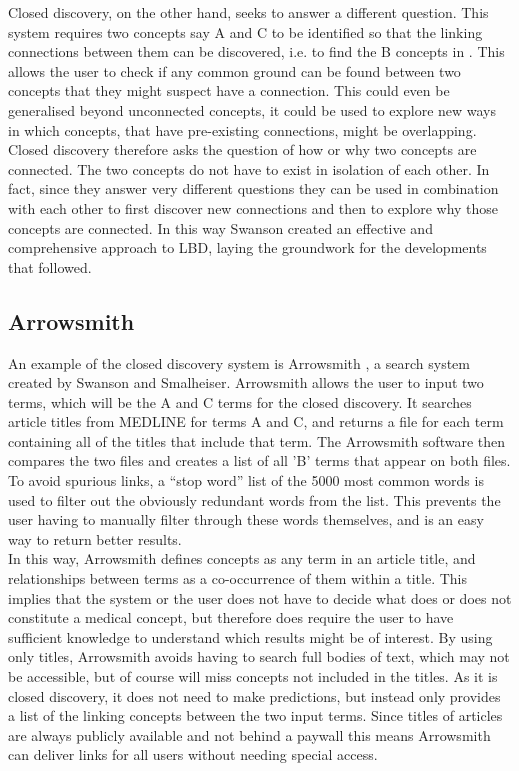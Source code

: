 \documentclass{l4proj}
\begin{document}
Closed discovery, on the other hand, seeks to answer a different question. This system requires two concepts say A and C to be identified so that the linking connections between them can be discovered, i.e. to find the B concepts in . This allows the user to check if any common ground can be found between two concepts that they might suspect have a connection. This could even be generalised beyond unconnected concepts, it could be used to explore new ways in which concepts, that have pre-existing connections, might be overlapping. Closed discovery therefore asks the question of how or why two concepts are connected. The two concepts do not have to exist in isolation of each other. In fact, since they answer very different questions they can be used in combination with each other to first discover new connections and then to explore why those concepts are connected. In this way Swanson created an effective and comprehensive approach to LBD, laying the groundwork for the developments that followed. \\ 

\subsection{Arrowsmith}

An example of the closed discovery system is Arrowsmith \citep{swanson_interactive_1997}, a search system created by Swanson and Smalheiser. Arrowsmith allows the user to input two terms, which will be the A and C terms for the closed discovery. It searches article titles from MEDLINE \citep{medline} for terms A and C, and returns a file for each term containing all of the titles that include that term. The Arrowsmith software then compares the two files and creates a list of all 'B' terms that appear on both files. To avoid spurious links, a ``stop word'' list of the 5000 most common words is used to filter out the obviously redundant words from the list. This prevents the user having to manually filter through these words themselves, and is an easy way to return better results.\\

In this way, Arrowsmith defines concepts as any term in an article title, and relationships between terms as a co-occurrence of them within a title. This implies that the system or the user does not have to decide what does or does not constitute a medical concept, but therefore does require the user to have sufficient knowledge to understand which results might be of interest. By using only titles, Arrowsmith avoids having to search full bodies of text, which may not be accessible, but of course will miss concepts not included in the titles. As it is closed discovery, it does not need to make predictions, but instead only provides a list of the linking concepts between the two input terms. Since titles of articles are always publicly available and not behind a paywall this means Arrowsmith can deliver links for all users without needing special access.\\
\end{document}
